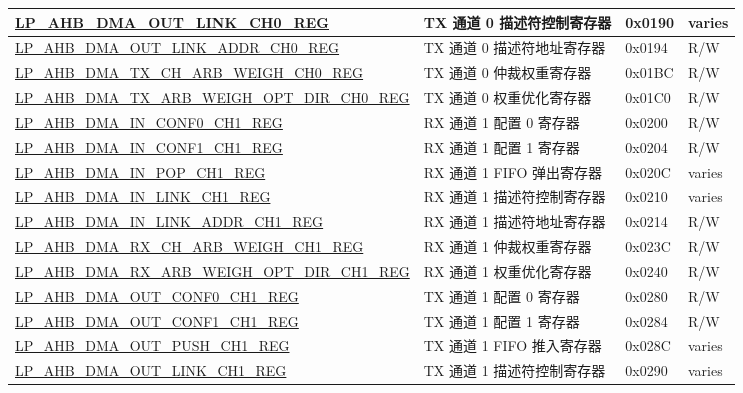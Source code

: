 \begin{longtable}{ | l | l | p{1.3cm} | l | }
\hyperref[regdesc:LPAHBDMAOUTLINKCHNREG]{LP\_AHB\_DMA\_OUT\_LINK\_CH0\_REG} & TX 通道 0 描述符控制寄存器 & 0x0190 & varies \\ \hline
\hyperref[regdesc:LPAHBDMAOUTLINKADDRCHNREG]{LP\_AHB\_DMA\_OUT\_LINK\_ADDR\_CH0\_REG} & TX 通道 0 描述符地址寄存器 & 0x0194 & R/W \\ \hline
\hyperref[regdesc:LPAHBDMATXCHARBWEIGHCHNREG]{LP\_AHB\_DMA\_TX\_CH\_ARB\_WEIGH\_CH0\_REG} & TX 通道 0 仲裁权重寄存器 & 0x01BC & R/W \\ \hline
\hyperref[regdesc:LPAHBDMATXARBWEIGHOPTDIRCHNREG]{LP\_AHB\_DMA\_TX\_ARB\_WEIGH\_OPT\_DIR\_CH0\_REG} & TX 通道 0 权重优化寄存器 & 0x01C0 & R/W \\ \hline
\hyperref[regdesc:LPAHBDMAINCONF0CHNREG]{LP\_AHB\_DMA\_IN\_CONF0\_CH1\_REG} & RX 通道 1 配置 0 寄存器 & 0x0200 & R/W \\ \hline
\hyperref[regdesc:LPAHBDMAINCONF1CHNREG]{LP\_AHB\_DMA\_IN\_CONF1\_CH1\_REG} & RX 通道 1 配置 1 寄存器 & 0x0204 & R/W \\ \hline
\hyperref[regdesc:LPAHBDMAINPOPCHNREG]{LP\_AHB\_DMA\_IN\_POP\_CH1\_REG} & RX 通道 1 FIFO 弹出寄存器 & 0x020C & varies \\ \hline
\hyperref[regdesc:LPAHBDMAINLINKCHNREG]{LP\_AHB\_DMA\_IN\_LINK\_CH1\_REG} & RX 通道 1 描述符控制寄存器 & 0x0210 & varies \\ \hline
\hyperref[regdesc:LPAHBDMAINLINKADDRCHNREG]{LP\_AHB\_DMA\_IN\_LINK\_ADDR\_CH1\_REG} & RX 通道 1 描述符地址寄存器 & 0x0214 & R/W \\ \hline
\hyperref[regdesc:LPAHBDMARXCHARBWEIGHCHNREG]{LP\_AHB\_DMA\_RX\_CH\_ARB\_WEIGH\_CH1\_REG} & RX 通道 1 仲裁权重寄存器 & 0x023C & R/W \\ \hline
\hyperref[regdesc:LPAHBDMARXARBWEIGHOPTDIRCHNREG]{LP\_AHB\_DMA\_RX\_ARB\_WEIGH\_OPT\_DIR\_CH1\_REG} & RX 通道 1 权重优化寄存器 & 0x0240 & R/W \\ \hline
\hyperref[regdesc:LPAHBDMAOUTCONF0CHNREG]{LP\_AHB\_DMA\_OUT\_CONF0\_CH1\_REG} & TX 通道 1 配置 0 寄存器 & 0x0280 & R/W \\ \hline
\hyperref[regdesc:LPAHBDMAOUTCONF1CHNREG]{LP\_AHB\_DMA\_OUT\_CONF1\_CH1\_REG} & TX 通道 1 配置 1 寄存器 & 0x0284 & R/W \\ \hline
\hyperref[regdesc:LPAHBDMAOUTPUSHCHNREG]{LP\_AHB\_DMA\_OUT\_PUSH\_CH1\_REG} & TX 通道 1 FIFO 推入寄存器 & 0x028C & varies \\ \hline
\hyperref[regdesc:LPAHBDMAOUTLINKCHNREG]{LP\_AHB\_DMA\_OUT\_LINK\_CH1\_REG} & TX 通道 1 描述符控制寄存器 & 0x0290 & varies \\ \hline

\end{longtable}
